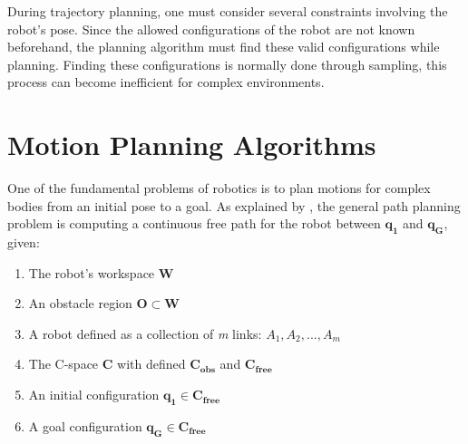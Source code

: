 During trajectory planning, one must consider several constraints involving the robot's pose. Since the allowed configurations of the robot are not known beforehand, the planning algorithm must find these valid configurations while planning. Finding these configurations is normally done through sampling, this process can become inefficient for complex environments.

%

\section{Motion Planning Algorithms}

One of the fundamental problems of robotics is to plan motions for complex bodies from an initial pose to a goal. As explained by \citet{Handbook}, the general path planning problem is computing a continuous free path for the robot between $\bm{q_{1}}$ and $\bm{q_{G}}$, given:
\begin{enumerate}
	\vspace{-5pt}
	\item The robot's workspace $\bm{W}$
	\vspace{-5pt}
	\item An obstacle region $\bm{O} \subset \bm{W}$
	\vspace{-5pt}
	\item A robot defined as a collection of \textit{m} links: $A_{1}, A_{2}, ... , A_{m}$
	\vspace{-5pt}
	\item The C-space $\bm{C}$ with defined $\bm{C_{obs}}$ and $\bm{C_{free}}$
	\vspace{-5pt} 
	\item An initial configuration $\bm{q_{1}} \in  \bm{C_{free}}$
	\vspace{-5pt} 
	\item A goal configuration $\bm{q_{G}} \in  \bm{C_{free}}$
\end{enumerate}

